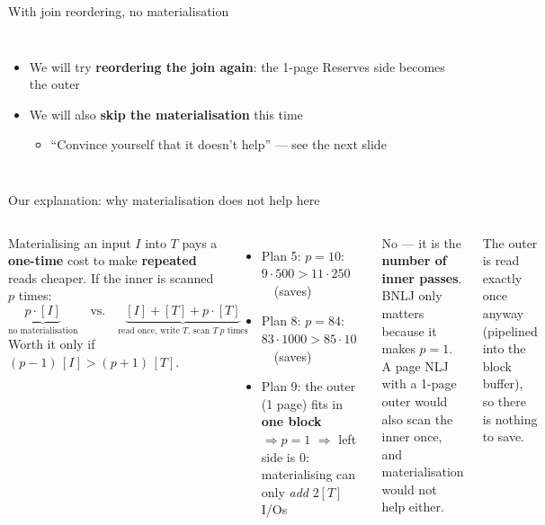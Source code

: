 \begin{frame}{With join reordering, no materialisation }
  \begin{columns}[c]
      \begin{itemize}
        \item We will try \textbf{reordering the join again}: the 1-page Reserves side becomes the outer
        \item We will also \textbf{skip the materialisation} this time
        \begin{itemize}
          \item ``Convince yourself that it doesn't help'' --- see the next slide
        \end{itemize}
      \end{itemize}
      \planbox{62mm}{\PlanEightP}
  \end{columns}
\end{frame}

\begin{frame}{Our explanation: why materialisation does not help here}
  \begin{columns}[T]
      \footnotesize
      Materialising an input $I$ into $T$ pays a \textbf{one-time} cost to make \textbf{repeated} reads cheaper.
      If the inner is scanned $p$ times:
      \vspace{-1mm}
      \[
        \underbrace{p \cdot [I]}_{\text{no materialisation}}
        \quad\text{vs.}\quad
        \underbrace{[I] + [T] + p \cdot [T]}_{\text{read once, write } T\text{, scan } T\ p \text{ times}}
      \]
      Worth it only if $(p - 1)\,[I] > (p + 1)\,[T]$.
      \begin{itemize}
        \item Plan 5: $p = 10$: \ $9 \cdot 500 > 11 \cdot 250$ \ \checkmark\ (saves)
        \item Plan 8: $p = 84$: \ $83 \cdot 1000 > 85 \cdot 10$ \ \checkmark\ (saves)
        \item Plan 9: the outer (1 page) fits in \textbf{one block} $\Rightarrow p = 1$ $\Rightarrow$ left side is 0:
              materialising can only \emph{add} $2[T]$ I/Os
      \end{itemize}
      \begin{extrabox}
        \footnotesize No --- it is the \textbf{number of inner passes}. BNLJ only matters because it makes $p = 1$.
        A page NLJ with a 1-page outer would also scan the inner once, and materialisation would not help either.
      \end{extrabox}
      \begin{extrabox}
        \footnotesize The outer is read exactly once anyway (pipelined into the block buffer), so there is nothing to save.
      \end{extrabox}
  \end{columns}
\end{frame}

